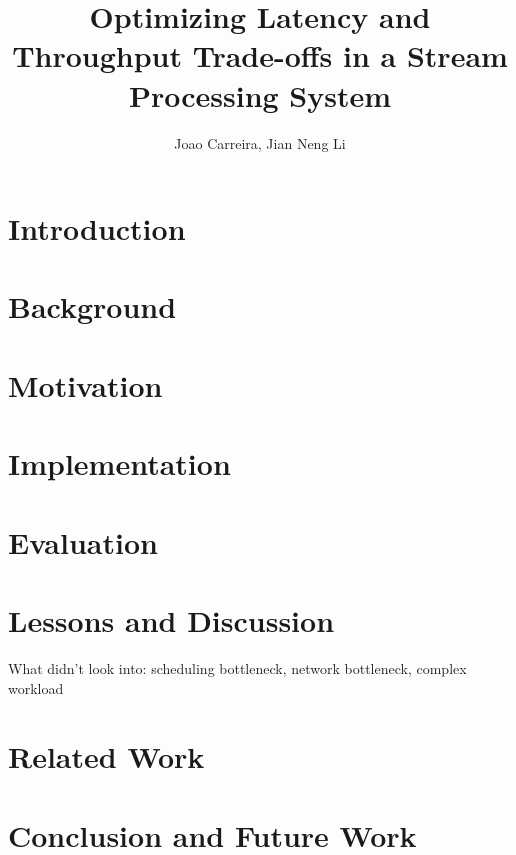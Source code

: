 \documentclass[10pt,twocolumn]{article}
\begin{document}
\title{{\bf Optimizing Latency and Throughput Trade-offs in a Stream Processing System}}
\author[1]{{Joao Carreira, Jian Neng Li}}
\date{}
\maketitle

\begin{abstract}

\end{abstract}

\section{Introduction}


\section{Background}


\section{Motivation}


\section{Implementation}


\section{Evaluation}


\section{Lessons and Discussion}
What didn't look into: scheduling bottleneck, network bottleneck, complex workload

\section{Related Work}


\section{Conclusion and Future Work}




\end{document}
